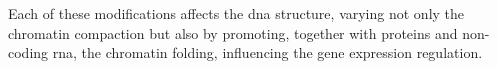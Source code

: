 Each of these modifications affects the \gls{dna} structure, varying not only the chromatin compaction but also by promoting, together with proteins and non-coding \gls{rna}, the chromatin folding, influencing the gene expression regulation.

%

  


